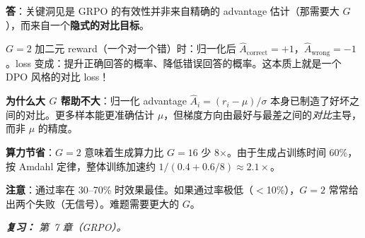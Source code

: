 \begin{questionbox}[Q24：论文 ``It Takes Two'' 表明 G=2 与 G=16 效果相当。这怎么可能？]
\textbf{答}：关键洞见是 GRPO 的有效性并非来自精确的 advantage 估计（那需要大 $G$），而来自一个\textbf{隐式的对比目标}。

$G=2$ 加二元 reward（一个对一个错）时：归一化后 $\hat{A}_\text{correct} = +1$，$\hat{A}_\text{wrong} = -1$。loss 变成：提升正确回答的概率、降低错误回答的概率。这本质上就是一个 DPO 风格的对比 loss！

\textbf{为什么大 $G$ 帮助不大}：归一化 advantage $\hat{A}_i = (r_i - \mu)/\sigma$ 本身已制造了好坏之间的对比。更多样本能更准确估计 $\mu$，但梯度方向由最好与最差之间的\emph{对比}主导，而非 $\mu$ 的精度。

\textbf{算力节省}：$G=2$ 意味着生成算力比 $G=16$ 少 8$\times$。由于生成占训练时间 60\%，按 Amdahl 定律，整体训练加速约 $1/(0.4+0.6/8) \approx 2.1\times$。

\textbf{注意}：通过率在 30--70\% 时效果最佳。如果通过率极低（$<$10\%），$G=2$ 常常给出两个失败（无信号）。难题需要更大的 $G$。

\emph{\textbf{复习：} 第~7 章（GRPO）。}
\end{questionbox}

